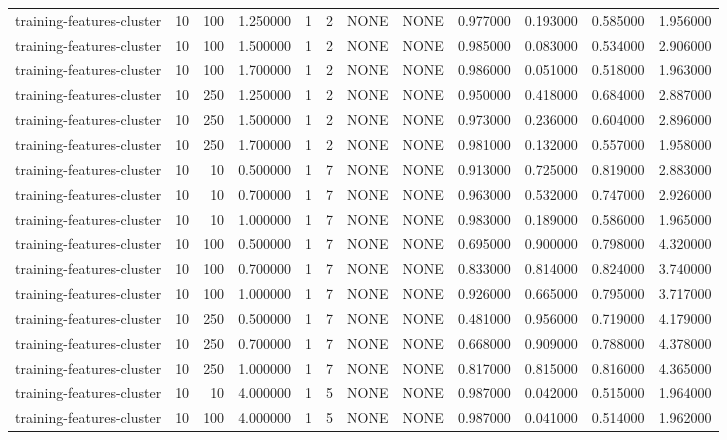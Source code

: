 \begin{tabular}{lrrrllllrrrr}
training-features-cluster & 10 & 100 & 1.250000 & 1 & 2 & NONE & NONE & 0.977000 & 0.193000 & 0.585000 & 1.956000 \\
training-features-cluster & 10 & 100 & 1.500000 & 1 & 2 & NONE & NONE & 0.985000 & 0.083000 & 0.534000 & 2.906000 \\
training-features-cluster & 10 & 100 & 1.700000 & 1 & 2 & NONE & NONE & 0.986000 & 0.051000 & 0.518000 & 1.963000 \\
training-features-cluster & 10 & 250 & 1.250000 & 1 & 2 & NONE & NONE & 0.950000 & 0.418000 & 0.684000 & 2.887000 \\
training-features-cluster & 10 & 250 & 1.500000 & 1 & 2 & NONE & NONE & 0.973000 & 0.236000 & 0.604000 & 2.896000 \\
training-features-cluster & 10 & 250 & 1.700000 & 1 & 2 & NONE & NONE & 0.981000 & 0.132000 & 0.557000 & 1.958000 \\
training-features-cluster & 10 & 10 & 0.500000 & 1 & 7 & NONE & NONE & 0.913000 & 0.725000 & 0.819000 & 2.883000 \\
training-features-cluster & 10 & 10 & 0.700000 & 1 & 7 & NONE & NONE & 0.963000 & 0.532000 & 0.747000 & 2.926000 \\
training-features-cluster & 10 & 10 & 1.000000 & 1 & 7 & NONE & NONE & 0.983000 & 0.189000 & 0.586000 & 1.965000 \\
training-features-cluster & 10 & 100 & 0.500000 & 1 & 7 & NONE & NONE & 0.695000 & 0.900000 & 0.798000 & 4.320000 \\
training-features-cluster & 10 & 100 & 0.700000 & 1 & 7 & NONE & NONE & 0.833000 & 0.814000 & 0.824000 & 3.740000 \\
training-features-cluster & 10 & 100 & 1.000000 & 1 & 7 & NONE & NONE & 0.926000 & 0.665000 & 0.795000 & 3.717000 \\
training-features-cluster & 10 & 250 & 0.500000 & 1 & 7 & NONE & NONE & 0.481000 & 0.956000 & 0.719000 & 4.179000 \\
training-features-cluster & 10 & 250 & 0.700000 & 1 & 7 & NONE & NONE & 0.668000 & 0.909000 & 0.788000 & 4.378000 \\
training-features-cluster & 10 & 250 & 1.000000 & 1 & 7 & NONE & NONE & 0.817000 & 0.815000 & 0.816000 & 4.365000 \\
training-features-cluster & 10 & 10 & 4.000000 & 1 & 5 & NONE & NONE & 0.987000 & 0.042000 & 0.515000 & 1.964000 \\
training-features-cluster & 10 & 100 & 4.000000 & 1 & 5 & NONE & NONE & 0.987000 & 0.041000 & 0.514000 & 1.962000 \\

\end{tabular}
